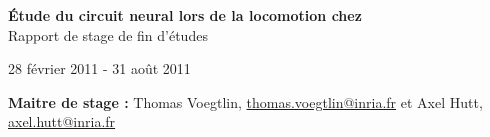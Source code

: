 
\vspace*{\fill}
\begin{center}
   \textbf{ {\Huge Étude du circuit neural lors de la locomotion chez \caeleg{}}}\\[0.5em]{\huge Rapport de stage de fin d'études}
\end{center}

\begin{center}
  28 février 2011 - 31 août 2011
\end{center}

\begin{center}
   \textbf{Maitre de stage :} Thomas Voegtlin, \url{thomas.voegtlin@inria.fr} et Axel Hutt, \url{axel.hutt@inria.fr}
\end{center}

\vspace*{\fill}

\newpage

